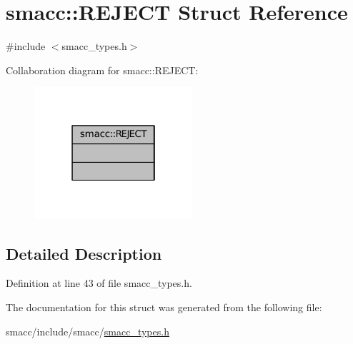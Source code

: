 \hypertarget{structsmacc_1_1REJECT}{}\section{smacc\+:\+:R\+E\+J\+E\+CT Struct Reference}
\label{structsmacc_1_1REJECT}


{\ttfamily \#include $<$smacc\+\_\+types.\+h$>$}



Collaboration diagram for smacc\+:\+:R\+E\+J\+E\+CT\+:
\nopagebreak
\begin{figure}[H]
\begin{center}
\leavevmode
\includegraphics[width=166pt]{structsmacc_1_1REJECT__coll__graph}
\end{center}
\end{figure}


\subsection{Detailed Description}


Definition at line 43 of file smacc\+\_\+types.\+h.



The documentation for this struct was generated from the following file\+:\begin{DoxyCompactItemize}
\item 
smacc/include/smacc/\hyperlink{smacc__types_8h}{smacc\+\_\+types.\+h}\end{DoxyCompactItemize}
